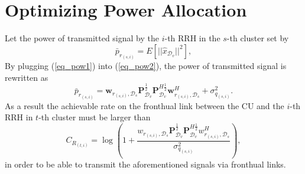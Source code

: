 \documentclass[journal,onecolumn,11pt,draftcls,doublespace]{IEEEtran}
\begin{document}
\section{Optimizing Power Allocation}
Let the power of transmitted signal by the $i$-th RRH in the $s$-th cluster set by
\begin{equation} \label{eq_pow2}
\bar{p}_{r_{(s,i)}} = \mathit{E}[|| \hat{x}_{\mathcal{D}_v} ||^2],
\end{equation}
By plugging (\ref{eq_pow1}) into (\ref{eq_pow2}), the power of transmitted signal is rewritten as
\begin{equation}
\bar{p}_{r_{(s,i)}} = \boldsymbol{w}_{r_{(s,i)},\mathcal{D}_{s}} \boldsymbol{P}_{\mathcal{D}_v}^{\frac{1}{2}} \boldsymbol{P}_{\mathcal{D}_v}^{H \frac{1}{2}}   \boldsymbol{w}_{r_{(s,i)},\mathcal{D}_{s}}^H + \sigma_{q_{(s,i)}}^2.
\end{equation}
As a result the achievable rate on the fronthual link between the CU and the $i$-th RRH in $t$-th cluster must be larger than
\begin{equation}
C_{R_{(t,i)}} = \log{(1+\frac{w_{r_{(s,i)},\mathcal{D}_{s}} \boldsymbol{P}_{\mathcal{D}_v}^{\frac{1}{2}} \boldsymbol{P}_{\mathcal{D}_v}^{H \frac{1}{2}}   w_{r_{(s,i)},\mathcal{D}_{s}}^H }{ \sigma_{q_{(s,i)}}^2})},
\end{equation}
in order to be able to transmit the aforementioned signals via fronthual links.
\end{document}
